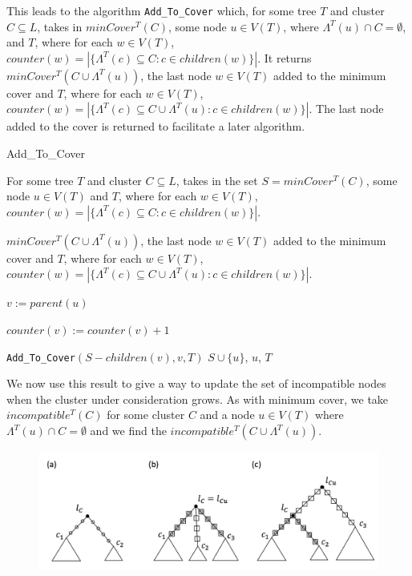 \documentclass{article}
\newcommand{\leafset}{\Lambda}
\begin{document}
    This leads to the algorithm \texttt{Add\_To\_Cover} which, for some tree $T$ and cluster $C \subseteq L$, takes in $minCover^{T}(C)$, some node $u \in V(T)$, where $\leafset^{T}(u) \cap C = \emptyset$, and $T$, where for each $w \in V(T)$, $counter(w) = |\{\leafset^{T}(c) \subseteq C : c \in children(w)\}|$. It returns $minCover^{T}(C \cup \leafset^{T}(u))$, the last node $w \in V(T)$ added to the minimum cover and $T$, where for each $w \in V(T)$, $counter(w) = |\{\leafset^{T}(c) \subseteq C \cup \leafset^{T}(u) : c \in children(w)\}|$. The last node added to the cover is returned to facilitate a later algorithm.

    \begin{algorithm}
        \caption{Add\_To\_Cover}
        \label{alg:addtocover}

        \begin{algorithmic}[1]
            \Input For some tree $T$ and cluster $C \subseteq L$, takes in the set $S = minCover^{T}(C)$, some node $u \in V(T)$ and $T$, where for each $w \in V(T)$, $counter(w) = |\{\leafset^{T}(c) \subseteq C : c \in children(w)\}|$.

            \Output $minCover^{T}(C \cup \leafset^{T}(u))$, the last node $w \in V(T)$ added to the minimum cover and $T$, where for each $w \in V(T)$, $counter(w) = |\{\leafset^{T}(c) \subseteq C \cup \leafset^{T}(u) : c \in children(w)\}|$.

            \State $v := parent(u)$

            \State $counter(v) := counter(v) + 1$

                \State \Return \texttt{Add\_To\_Cover}$(S - children(v), v, T)$
            \Else
                \State \Return $S \cup \{u\}$, $u$, $T$
            \EndIf
        \end{algorithmic}
    \end{algorithm}

    We now use this result to give a way to update the set of incompatible nodes when the cluster under consideration grows. As with minimum cover, we take $incompatible^{T}(C)$ for some cluster $C$ and a node $u \in V(T)$ where $\leafset^{T}(u) \cap C = \emptyset$ and we find the $incompatible^{T}(C \cup \leafset^{T}(u))$.

    \begin{figure}[h]
        \includegraphics[scale=0.6]{incompatibilityrecursive}
        \centering
        \caption{}
        \label{fig:incompatibilityrecursive}
    \end{figure}
\end{document}
